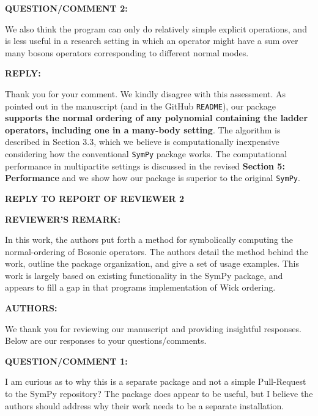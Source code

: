 \documentclass[12pt, a4paper]{article}
\newcommand{\code}[1]{\colorbox{gray!25}{\texttt{#1}}}
\newcommand{\review}[1]{
\newpage
\phantomsection
\vspace*{\fill}
\begin{center}
\Large{\uppercase{{\textbf{Reply to Report of Reviewer {#1}}}}}
\end{center}
\vspace*{\fill}
}
\newenvironment{revremark}{%
\newpage
\phantomsection
\color{RoyalPurple}
\par
\textbf{REVIEWER'S REMARK:}
\par
}
{}
\newenvironment{revthanks}{%
\color{Black}
\textbf{AUTHORS:}
\par 
We thank you for reviewing our manuscript and providing insightful responses. Below are our responses to your questions/comments.
}
{}
\newenvironment{revq}[1]{%
\newpage\phantomsection
\color{RoyalPurple}
\par
\textbf{QUESTION/COMMENT {#1}:}
\par
}
{\bigskip}
\newenvironment{reva}{%
\color{Black}
\par
\textbf{REPLY:}
\par
}
{\bigskip}
\begin{document}

\begin{revq}{2}
We also think the program can only do relatively simple explicit operations, and is less useful in a research setting in which an operator might have a sum over many bosons operators corresponding to different normal modes.
\end{revq}

\begin{reva}
Thank you for your comment. We kindly disagree with this assessment. As pointed out in the manuscript (and in the GitHub \code{README}), our package \textbf{supports the normal ordering of any polynomial containing the ladder operators, including one in a many-body setting}. The algorithm is described in Section 3.3, which we believe is computationally inexpensive considering how the conventional \texttt{SymPy} package works. The computational performance in multipartite settings is discussed in the revised \textbf{Section 5: Performance} and we show how our package is superior to the original \texttt{SymPy}.
\end{reva}


\review{2}


\begin{revremark}
    In this work, the authors put forth a method for symbolically computing the normal-ordering of Bosonic operators. The authors detail the method behind the work, outline the package organization, and give a set of usage examples. This work is largely based on existing functionality in the SymPy package, and appears to fill a gap in that programs implementation of Wick ordering.
\end{revremark}

\begin{revthanks}
\end{revthanks}


\begin{revq}{1}
I am curious as to why this is a separate package and not a simple Pull-Request to the SymPy repository? The package does appear to be useful, but I believe the authors should address why their work needs to be a separate installation. 

\end{revq}
\end{document}
